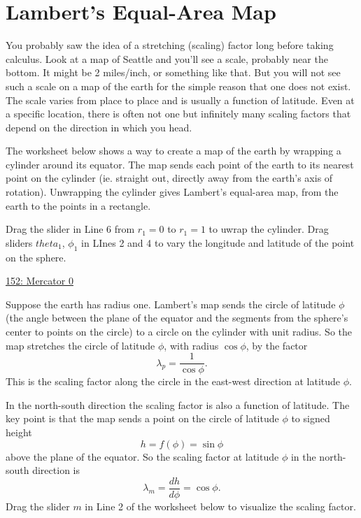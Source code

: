 \documentclass{ximera}
\begin{document}
\section{Lambert's Equal-Area Map}


You probably saw the idea of a stretching (scaling) factor long before taking calculus. Look at a map of Seattle and you'll see a scale, probably near the bottom. It might be 2 miles/inch, or something like that. But you will not see such a scale on a map of the earth for the simple reason that one does not exist. The scale varies from place to place and is usually a function of latitude. Even at a specific location, there is often not one but infinitely many scaling factors that depend on the direction in which you head. 

The worksheet below shows a way to create a map of the earth by wrapping a cylinder around its equator. The map sends each point of the earth to its nearest point on the cylinder (ie. straight out, directly away from the earth's axis of rotation). Unwrapping the cylinder gives Lambert's equal-area map, from the earth to the points in a rectangle.

\begin{exploration}  \label{EXPDkjkeFERerRd8}
Drag the slider in Line 6  from $r_1=0$ to $r_1=1$ to uwrap the cylinder. Drag sliders $theta_1$, $\phi_1$ in LInes 2 and 4 to vary the longitude and latitude of the point on the sphere.
\begin{onlineOnly}
    \begin{center}
\end{center}
\end{onlineOnly}

\href{https://www.desmos.com/3d/ehyvvttdeo}{152: Mercator 0}

\end{exploration}

Suppose the earth has radius one. Lambert's map sends the circle of latitude $\phi$ (the angle between the plane of the equator and the segments from the sphere's center to points on the circle) to a circle on the cylinder with unit radius. So the map stretches the circle of latitude $\phi$, with radius $\cos\phi$, by the factor
\[
 \lambda_p = \frac{1}{\cos\phi}.
\]
This is the scaling factor along the circle in the east-west direction at latitude $\phi$.

In the north-south direction the scaling factor is also a function of latitude. The key point is that the map sends a point on the circle of latitude $\phi$ to signed height
\[
    h = f(\phi) = \sin\phi 
\]
above the plane of the equator. So the scaling factor at latitude $\phi$ in the north-south direction is
\[
 \lambda_m = \frac{dh}{d\phi} = \cos \phi.
 \]
Drag the slider $m$ in Line 2 of the worksheet below to visualize the scaling factor.
\end{document}
